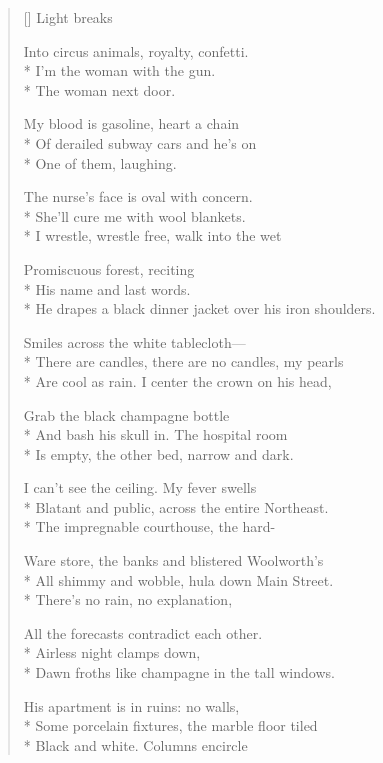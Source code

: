 \label{ch:fever}
\settowidth{\versewidth}{He drapes a black dinner jacket over his iron shoulders.}
\begin{verse}[\versewidth]
 \qquad  \qquad  \qquad Light breaks

Into circus animals, royalty, confetti.\\*
I'm the woman with the gun.\\*
The woman next door.

My blood is gasoline, heart a chain\\*
Of derailed subway cars and he's on\\*
One of them, laughing.

The nurse's face is oval with concern.\\*
She'll cure me with wool blankets.\\*
I wrestle, wrestle free, walk into the wet

Promiscuous forest, reciting\\*
His name and last words.\\*
He drapes a black dinner jacket over his iron shoulders.

Smiles across the white tablecloth---\\*
There are candles, there are no candles, my pearls\\*
Are cool as rain. I center the crown on his head,

Grab the black champagne bottle\\*
And bash his skull in.  The hospital room\\*
Is empty, the other bed, narrow and dark.

I can't see the ceiling.  My fever swells\\*
Blatant and public, across the entire Northeast.\\*
The impregnable courthouse, the hard-

Ware store, the banks and blistered Woolworth's\\*
All shimmy and wobble, hula down Main Street.\\*
There's no rain, no explanation, 

All the forecasts contradict each other.\\*
Airless night clamps down,\\*
Dawn froths like champagne in the tall windows.

His apartment is in ruins: no walls,\\*
Some porcelain fixtures, the marble floor tiled\\*
Black and white.  Columns encircle


\end{verse}
